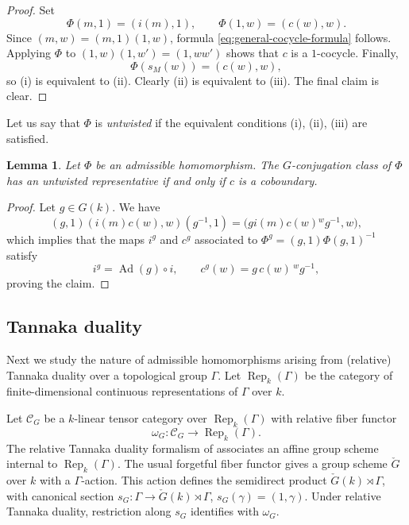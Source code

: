 \documentclass[reqno]{amsart}
\numberwithin{equation}{subsection}
\newcommand{\co}{\colon}
\newcommand\cC{\mathcal{C}}
\DeclareMathOperator{\Rep}{Rep}
\DeclareMathOperator{\Ad}{Ad}
\newcommand{\chG}{\check{G}}
\newtheorem{lemma}[thm]{Lemma}
\theoremstyle{remark}
\numberwithin{equation}{subsection}
\numberwithin{figure}{subsection}
\begin{document}
\begin{proof}
Set
\[
\Phi(m,1)=(i(m),1),
\qquad
\Phi(1,w)=(c(w),w).
\]
Since $(m,w)=(m,1)(1,w)$, formula
\eqref{eq:general-cocycle-formula} follows.  Applying $\Phi$ to
$(1,w)(1,w')=(1,ww')$ shows that $c$ is a $1$-cocycle.
Finally,
\[
\Phi(s_M(w))=(c(w),w),
\]
so (i) is equivalent to (ii). Clearly (ii) is equivalent to (iii). The final claim is clear. %
\end{proof}


Let us say that $\Phi$ is \emph{untwisted} if the equivalent conditions (i), (ii), (iii) are satisfied. 


\begin{lemma}\label{lem:conjugating-split-homomorphism}
Let $\Phi$ be an admissible homomorphism. The $G$-conjugation class of $\Phi$ has an untwisted representative if and only if $c$ is a coboundary. 
\end{lemma}

\begin{proof}
Let $g \in G(k)$. We have
\[
(g,1)(i(m)c(w),w)(g^{-1},1)
=\bigl(g i(m)c(w){}^w g^{-1},w\bigr),
\]
which implies that the maps $i^g$ and $c^g$ associated to $\Phi^g = (g,1)\Phi(g,1)^{-1}$ satisfy
\[
i^g=\Ad(g)\circ i,
\qquad
c^g(w)=g\,c(w)\,{}^w g^{-1},
\]
proving the claim.
\end{proof}



\subsection{Tannaka duality}
\label{sssec:relative-tannaka-general}

Next we study the nature of admissible homomorphisms arising from (relative) Tannaka duality over a topological group $\Gamma$. Let $\Rep_k(\Gamma)$ be the category of finite-dimensional continuous representations of $\Gamma$ over $k$.

Let $\cC_G$ be a $k$-linear tensor category over $\Rep_k(\Gamma)$ with relative fiber functor
\[
\omega_G\co\mathcal C_G\longrightarrow\Rep_k(\Gamma).
\]
The relative Tannaka duality formalism of
\cite[Proposition VI.10.2]{FS} associates an affine group scheme internal to $\Rep_k(\Gamma)$. The usual forgetful fiber functor gives a group scheme $\chG$ over $k$ with a $\Gamma$-action. This action defines the semidirect product $\chG(k)\rtimes\Gamma$, with canonical section $s_G\co\Gamma\to\chG(k)\rtimes\Gamma$, $s_G(\gamma)=(1,\gamma)$. Under relative Tannaka duality, restriction along $s_G$ identifies with $\omega_G$.
\end{document}
